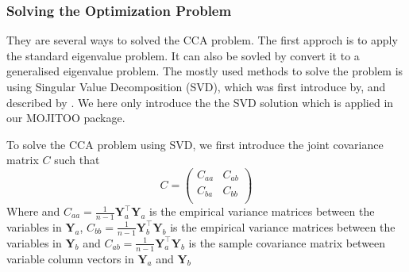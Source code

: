 \subsubsection{Solving the Optimization Problem}
They are several ways to solved the CCA problem. The first approch is to apply the standard eigenvalue problem\citep{HOTELLING1936cca2,hooper1959ccaeigen}. It can also be sovled by convert it to a generalised eigenvalue problem\citep{bach2002kernel,hardoon2004canonical}. The mostly used methods to solve the problem is using Singular Value Decomposition (SVD), which was first introduce by\citep{healy1957ccasvd}, and described by \citep{ewerbring1989canonical}. We here only introduce the the SVD solution which is applied in our MOJITOO package.


To solve the CCA problem using SVD, we first introduce the joint covariance matrix $C$ such that
\begin{equation}
	C = \begin{pmatrix}
		C_{aa} & C_{ab}\\
		C_{ba} & C_{bb}\\
	\end{pmatrix}	
\end{equation}
Where  and $C_{aa} = \frac{1}{n-1} \mathbf{Y}_a^\top \mathbf{Y}_a$ is the empirical variance matrices between the variables in $\mathbf{Y}_a$, $C_{bb} = \frac{1}{n-1} \mathbf{Y}_b^\top \mathbf{Y}_b$ is the empirical variance matrices between the variables in $\mathbf{Y}_b$ and $C_{ab} = \frac{1}{n-1} \mathbf{Y}_a^\top \mathbf{Y}_b$ is the sample covariance matrix between variable column vectors in $\mathbf{Y}_a$ and $\mathbf{Y}_b$

